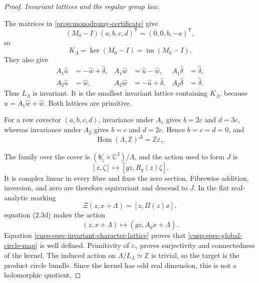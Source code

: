 \begin{proof}
\medskip\noindent\emph{Invariant lattices and the regular group law.}\par
The matrices in \cref{prop:monodromy-certificate} give
\[
 (M_0-I)(a,b,c,d)^{\mathsf T}=(0,0,b,-a)^{\mathsf T},
\]
so
\begin{equation}
 K_\Lambda=\ker(M_0-I)=\operatorname{im}(M_0-I).
 \label{cusp-spec-cusp-kernel}
\end{equation}
They also give
\begin{equation}
 \begin{aligned}
 A_1\widehat u&=-\widehat w+\widehat\delta,&
 A_1\widehat w&=\widehat u-\widehat w,&
 A_1\widehat\delta&=\widehat\delta,\\
 A_2\widehat u&=\widehat w,&
 A_2\widehat w&=-\widehat u+\widehat\delta,&
 A_2\widehat\delta&=\widehat\delta.
 \end{aligned}
 \label{cusp-spec-invariant-flag-calculation}
\end{equation}
Thus \(L_\Lambda\) is invariant.  It is the smallest invariant lattice
containing \(K_\Lambda\), because
\(\widehat u=A_1\widehat w+\widehat w\).  Both lattices are primitive.

For a row covector \((a,b,c,d)\), invariance under \(A_1\) gives
\(b=2c\) and \(d=3c\), whereas invariance under \(A_2\) gives
\(b=c\) and \(d=2c\).  Hence \(b=c=d=0\), and
\begin{equation}
 \operatorname{Hom}(\Lambda,\mathbb Z)^\Delta
 =\mathbb Z\varepsilon_\gamma.
 \label{cusp-spec-invariant-character-lattice}
\end{equation}

The family over the cover is
\((\mathfrak h_z^\circ\times\mathbb C^2)/\Lambda\), and the action used
to form \(J\) is
\[
 [z,\zeta]\longmapsto[gz,R_g(z)\zeta].
\]
It is complex linear in every fibre and fixes the zero section.
Fibrewise addition, inversion, and zero are therefore equivariant and
descend to \(J\).  In the flat real-analytic marking
\[
 \Xi(z,x+\Lambda)=[z,\Pi(z)x],
\]
equation (2.3d) makes the action
\[
 (z,x+\Lambda)\longmapsto(gz,A_gx+\Lambda).
\]
Equation \cref{cusp-spec-invariant-character-lattice} proves that
\cref{cusp-spec-global-circle-map} is well defined.  Primitivity of
\(\varepsilon_\gamma\) proves surjectivity and connectedness of the
kernel.  The induced action on \(\Lambda/L_\Lambda\simeq\mathbb Z\) is
trivial, so the target is the product circle bundle.  Since the kernel has
odd real dimension, this is not a holomorphic quotient.


\end{proof}

